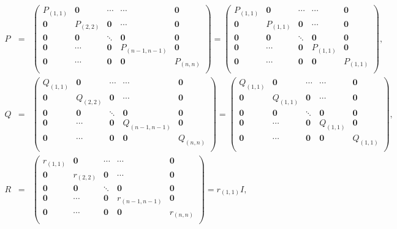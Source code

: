 \documentclass[aip,graphicx]{revtex4-1}
\begin{document}
\begin{eqnarray}
P&=&
\left(
\begin{array}{ccccc}
P_{(1,1)} & \bm{0} & \cdots & \cdots  & \bm{0}  \\
\bm{0}  & P_{(2,2)}& \bm{0} & \cdots  & \bm{0}  \\
\bm{0}  & \bm{0} & \ddots & \bm{0}  & \bm{0}  \\
\bm{0}  & \cdots & \bm{0} & P_{(n-1,n-1)} & \bm{0}  \\		
\bm{0}  & \cdots & \bm{0} & \bm{0}  & P_{(n,n)} \\
\end{array}
\right)
=
\left(\begin{array}{ccccc}
P_{(1,1)} & \bm{0} & \cdots & \cdots  & \bm{0}  \\
\bm{0}  & P_{(1,1)}& \bm{0} & \cdots  & \bm{0}  \\
\bm{0}  & \bm{0} & \ddots & \bm{0}  & \bm{0}  \\
\bm{0}  & \cdots & \bm{0} & P_{(1,1)} & \bm{0}  \\		
\bm{0}  & \cdots & \bm{0} & \bm{0}  & P_{(1,1)} \\
\end{array}
\right),\\
Q&=&
\left(
\begin{array}{ccccc}
Q_{(1,1)} & \bm{0} & \cdots & \cdots  & \bm{0}  \\
\bm{0}  & Q_{(2,2)}& \bm{0} & \cdots  & \bm{0}  \\
\bm{0}  & \bm{0} & \ddots & \bm{0}  & \bm{0}  \\
\bm{0}  & \cdots & \bm{0} & Q_{(n-1,n-1)} & \bm{0}  \\		
\bm{0}  & \cdots & \bm{0} & \bm{0}  & Q_{(n,n)} \\
\end{array}
\right)
=
\left(\begin{array}{ccccc}
Q_{(1,1)} & \bm{0} & \cdots & \cdots  & \bm{0}  \\
\bm{0}  & Q_{(1,1)}& \bm{0} & \cdots  & \bm{0}  \\
\bm{0}  & \bm{0} & \ddots & \bm{0}  & \bm{0}  \\
\bm{0}  & \cdots & \bm{0} & Q_{(1,1)} & \bm{0}  \\		
\bm{0}  & \cdots & \bm{0} & \bm{0}  & Q_{(1,1)} \\
\end{array}
\right),\\
R&=&
\left(
\begin{array}{ccccc}
r_{(1,1)} & \bm{0} & \cdots & \cdots  & \bm{0}  \\
\bm{0}  & r_{(2,2)}& \bm{0} & \cdots  & \bm{0}  \\
\bm{0}  & \bm{0} & \ddots & \bm{0}  & \bm{0}  \\
\bm{0}  & \cdots & \bm{0} & r_{(n-1,n-1)} & \bm{0}  \\		
\bm{0}  & \cdots & \bm{0} & \bm{0}  & r_{(n,n)} \\
\end{array}
\right)
=r_{(1,1)}I,
\end{eqnarray}
\end{document}
